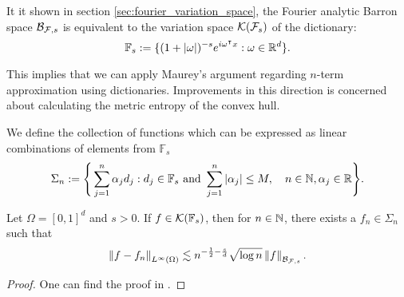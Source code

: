 It it shown in section \ref{sec:fourier_variation_space}, the Fourier analytic
Barron space $\mathcal{B}_{\mathcal{F},s}$ is equivalent to the variation space
$\mathcal{K}({\mathcal{F}_s})$ of the dictionary:
\begin{equation}
    \mathbb{F}_{s} := \{
        (1 + \left| \omega \right|)^{-s} e^{i\omega{}^{\intercal} x}: \omega \in \mathbb{R}^d
    \}.
\end{equation}

This implies that we can apply Maurey's argument regarding $n$-term
approximation using dictionaries. Improvements in this direction
\cite{siegelCharacterizationVariationSpaces2022,
siegelHighOrderApproximationRates2021,
siegelSharpBoundsApproximation2022,klusowskiRiskBoundsHighdimensional2018a} is
concerned about calculating the metric entropy of the convex hull. 

We define the collection of functions which can be expressed as linear
combinations of elements from $\mathbb{F}_s$
\begin{equation}
    \Sigma_n := \Bigg\{
        \sum_{j=1}^n \alpha_j d_j: 
        d_j \in \mathbb{F}_s \textnormal{ and } 
        \sum_{j=1}^n \left| \alpha_j \right| \leq M, \quad 
        n \in \mathbb{N}, \alpha_j \in \mathbb{R}
    \Bigg\}.
\end{equation}

\begin{theorem}
    Let $\Omega = [0,1]^d$ and $s > 0$. If $f \in \mathcal{K}(\mathbb{F}_s)$, then
    for $n \in \mathbb{N}$, there exists a $f_n \in \Sigma_n$ such that
    \begin{equation}
        \left\| f-f_n \right\|_{L^{\infty}(\Omega)} \lesssim 
        n^{-\frac{1}{2}-\frac{s}{d}} \sqrt{\log{n}} \left\| f \right\|_{\mathcal{B}_{\mathcal{F},s}}.
    \end{equation}

\end{theorem}

\begin{proof}
    One can find the proof in
    \cite{klusowskiApproximationCombinationsReLU2018a,siegelSharpBoundsApproximation2022}.
\end{proof}


